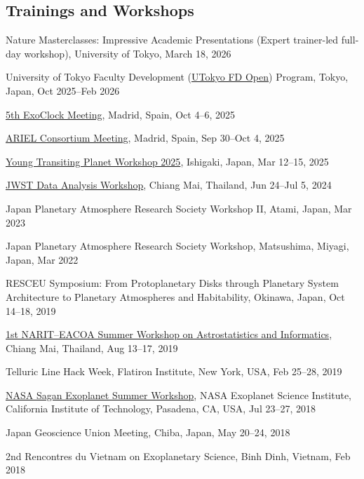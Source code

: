 \documentclass[12pt,letterpaper]{article}
\begin{document}
\subsection{Trainings and Workshops}
\begin{list}{}{\cvlist}
    \item Nature Masterclasses: Impressive Academic Presentations (Expert trainer-led full-day workshop), University of Tokyo, March 18, 2026
    \item University of Tokyo Faculty Development (\href{https://utokyofd.com/en/ffdp/about/}{UTokyo FD Open}) Program, Tokyo, Japan, Oct 2025--Feb 2026
    \item \href{https://www.exoclock.space/annual_meetings}{5th ExoClock Meeting}, Madrid, Spain, Oct 4--6, 2025
    \item \href{https://eventos.upm.es/132958/detail/ariel-consortium-meeting-madrid.html}{ARIEL Consortium Meeting}, Madrid, Spain, Sep 30--Oct 4, 2025
    \item \href{https://sites.google.com/g.ecc.u-tokyo.ac.jp/young-transiting-planet-worksh/home}{Young Transiting Planet Workshop 2025}, Ishigaki, Japan, Mar 12--15, 2025
    \item \href{https://indico.narit.or.th/event/203/}{JWST Data Analysis Workshop}, Chiang Mai, Thailand, Jun 24--Jul 5, 2024
    \item Japan Planetary Atmosphere Research Society Workshop II, Atami, Japan, Mar 2023
    \item Japan Planetary Atmosphere Research Society Workshop, Matsushima, Miyagi, Japan, Mar 2022
    \item RESCEU Symposium: From Protoplanetary Disks through Planetary System Architecture to Planetary Atmospheres and Habitability, Okinawa, Japan, Oct 14--18, 2019
    \item \href{https://indico.narit.or.th/event/112/overview}{1st NARIT--EACOA Summer Workshop on Astrostatistics and Informatics}, Chiang Mai, Thailand, Aug 13--17, 2019
    \item Telluric Line Hack Week, Flatiron Institute, New York, USA, Feb 25--28, 2019
    \item \href{https://nexsci.caltech.edu/workshop/2018/}{NASA Sagan Exoplanet Summer Workshop}, NASA Exoplanet Science Institute, California Institute of Technology, Pasadena, CA, USA, Jul 23--27, 2018
    \item Japan Geoscience Union Meeting, Chiba, Japan, May 20--24, 2018
    \item 2nd Rencontres du Vietnam on Exoplanetary Science, Binh Dinh, Vietnam, Feb 2018

\end{list}
\end{document}
